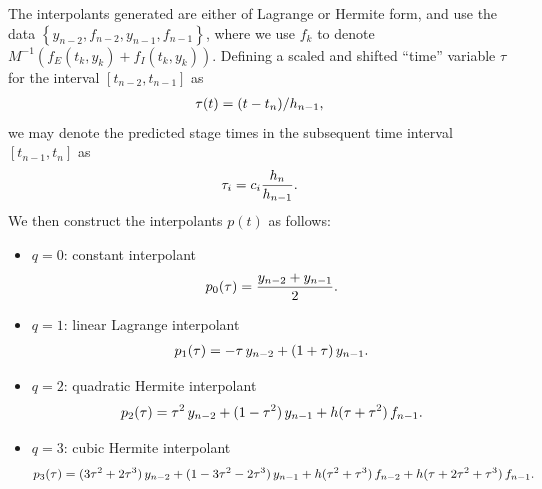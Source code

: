 \documentclass[letterpaper,10pt,english]{sphinxmanual}
\begin{document}
The interpolants generated are either of Lagrange or Hermite form, and
use the data $\left\{ y_{n-2}, f_{n-2}, y_{n-1}, f_{n-1}
\right\}$, where we use $f_{k}$ to denote $M^{-1}
\left(f_E(t_k,y_k) + f_I(t_k,y_k)\right)$.  Defining a scaled and
shifted ``time'' variable $\tau$ for the interval $[t_{n-2},
t_{n-1}]$ as
\begin{gather}
\begin{split}\tau(t) = (t-t_n)/h_{n-1},\end{split}\notag
\end{gather}
we may denote the predicted stage times in the subsequent time
interval $[t_{n-1}, t_{n}]$ as
\begin{gather}
\begin{split}\tau_i = c_i \frac{h_n}{h_{n-1}}.\end{split}\notag
\end{gather}
We then construct the interpolants $p(t)$ as follows:
\begin{itemize}
\item {} 
$q=0$: constant interpolant
\begin{gather}
\begin{split}p_0(\tau) = \frac{y_{n-2} + y_{n-1}}{2}.\end{split}\notag
\end{gather}
\item {} 
$q=1$: linear Lagrange interpolant
\begin{gather}
\begin{split}p_1(\tau) = -\tau\, y_{n-2} + (1+\tau)\, y_{n-1}.\end{split}\notag
\end{gather}
\item {} 
$q=2$: quadratic Hermite interpolant
\begin{gather}
\begin{split}p_2(\tau) =  \tau^2\,y_{n-2} + (1-\tau^2)\,y_{n-1} + h(\tau+\tau^2)\,f_{n-1}.\end{split}\notag
\end{gather}
\item {} 
$q=3$: cubic Hermite interpolant
\begin{gather}
\begin{split}p_3(\tau) =  (3\tau^2 + 2\tau^3)\,y_{n-2} +
(1-3\tau^2-2\tau^3)\,y_{n-1} + h(\tau^2+\tau^3)\,f_{n-2} +
h(\tau+2\tau^2+\tau^3)\,f_{n-1}.\end{split}\notag
\end{gather}
\end{itemize}
\end{document}
